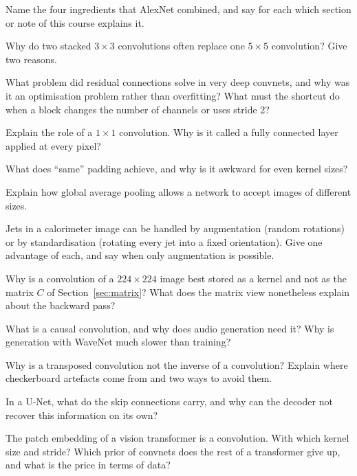 \documentclass[11pt]{article}
\begin{document}
\begin{questions}
\begin{conceptual}
\item Name the four ingredients that AlexNet combined, and say for each which section or note of this course explains it.
\item Why do two stacked $3 \times 3$ convolutions often replace one $5 \times 5$ convolution? Give two reasons.
\item What problem did residual connections solve in very deep convnets, and why was it an optimisation problem rather
  than overfitting? What must the shortcut do when a block changes the number of channels or uses stride 2?
\item Explain the role of a $1 \times 1$ convolution. Why is it called a fully connected layer applied at every pixel?
\item What does ``same'' padding achieve, and why is it awkward for even kernel sizes?
\item Explain how global average pooling allows a network to accept images of different sizes.
\item Jets in a calorimeter image can be handled by augmentation (random rotations) or by standardisation (rotating every
  jet into a fixed orientation). Give one advantage of each, and say when only augmentation is possible.
\item Why is a convolution of a $224 \times 224$ image best stored as a kernel and not as the matrix $C$ of
  Section~\ref{sec:matrix}? What does the matrix view nonetheless explain about the backward pass?
\item What is a causal convolution, and why does audio generation need it? Why is generation with WaveNet much slower
  than training?
\item Why is a transposed convolution not the inverse of a convolution? Explain where checkerboard artefacts come from
  and two ways to avoid them.
\item In a U-Net, what do the skip connections carry, and why can the decoder not recover this information on its own?
\item The patch embedding of a vision transformer is a convolution. With which kernel size and stride? Which prior of
  convnets does the rest of a transformer give up, and what is the price in terms of data?
\end{conceptual}


\end{questions}
\end{document}
